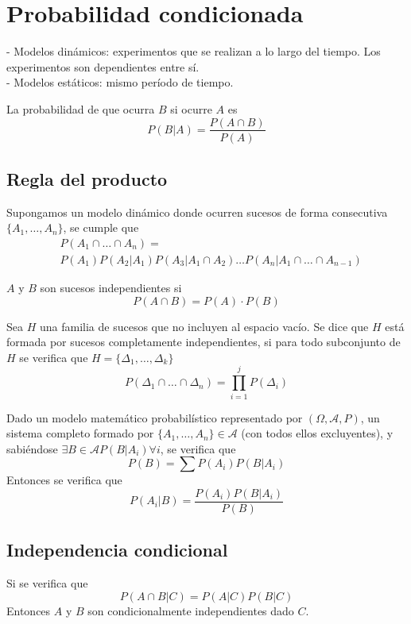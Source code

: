 \documentclass{./Probabilidad.tex}
\begin{document}
\chapter{Probabilidad condicionada}
- Modelos dinámicos: experimentos que se realizan a lo largo del tiempo. Los experimentos son dependientes entre sí.\\
- Modelos estáticos: mismo período de tiempo.

La probabilidad de que ocurra $B$ si ocurre $A$ es
$$
P(B|A)= \frac{P(A\cap B)}{P(A)}
$$
\section{Regla del producto}
Supongamos un modelo dinámico donde ocurren sucesos de forma consecutiva $\{ A_{1},\dots,A_{n} \}$, se cumple que
\begin{equation}
	\begin{split}
		&P(A_{1}\cap\dots \cap A_{n})=\\ &P(A_{1})P(A_{2}|A_{1})P(A_{3}|A_{1}\cap A_{2})\dots P(A_{n}|A_{1}\cap\dots \cap A_{n-1})
	\end{split}
\end{equation}
\begin{defin}

$A$ y $B$ son sucesos independientes si
$$
P(A\cap B)=P(A)\cdot P(B)
$$

\end{defin}
\begin{defin}
Sea $H$ una familia de sucesos que no incluyen al espacio vacío. Se dice que $H$ está formada por sucesos completamente independientes, si para todo subconjunto de $H$ se verifica que $H=\{ \Delta_{1},\dots,\Delta_{k} \}$
$$
P(\Delta_{1}\cap\dots \cap\Delta_{n})=\prod_{i=1}^j P(\Delta_{i})
$$
\end{defin}
\begin{teorema}
	Dado un modelo matemático probabilístico representado por $(\Omega, \mathcal{A}, P)$, un sistema completo formado por $\{ A_{1},\dots,A_{n} \}\in \mathcal{A}$ (con todos ellos excluyentes), y sabiéndose $\exists B \in \mathcal{A}P(B|A_{i})\forall i$, se verifica que
$$
P(B)=\sum P(A_{i}) P(B|A_{i})
$$
Entonces se verifica que
$$
P(A_{i}|B) = \frac{P(A_{i})P(B|A_{i})}{P(B)}
$$
\end{teorema}
\section{Independencia condicional}
Si se verifica que
$$
P(A\cap B|C)=P(A|C)P(B|C)
$$
Entonces $A$ y $B$ son condicionalmente independientes dado $C$.
\end{document}
